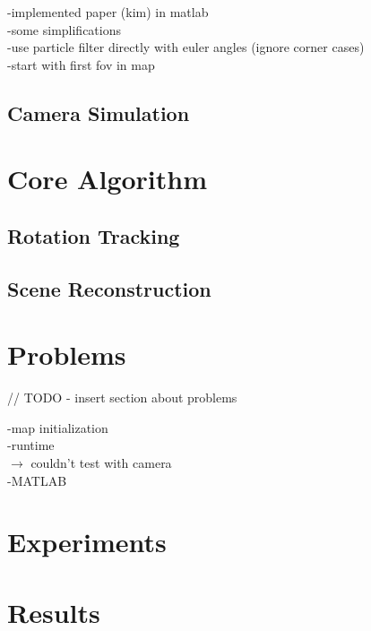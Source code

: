 \documentclass[10pt,twocolumn,letterpaper]{article}
\begin{document}
-implemented paper (kim) in matlab\\
-some simplifications\\
    -use particle filter directly with euler angles (ignore corner cases)\\
    -start with first fov in map\\

\subsection{Camera Simulation}
\label{sec:simulation}




\section{Core Algorithm}
\label{sec:core_algorithm}


\subsection{Rotation Tracking}
\label{sec:tracking}


\subsection{Scene Reconstruction}
\label{sec:scene_reconstruction}



\section{Problems}
\label{sec:problems}
// TODO - insert section about problems

-map initialization\\
-runtime\\
$\rightarrow$ couldn't test with camera\\
-MATLAB\\


\section{Experiments}
\label{sec:experiments}



\section{Results}
\label{sec:results}



{\small


}
\end{document}
